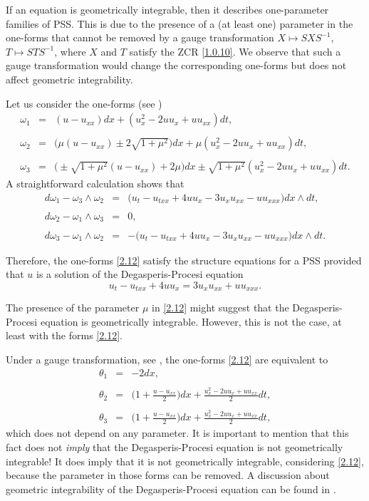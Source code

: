 \documentclass{cimart}
\newcommand{\ba}{\begin{array}}
\newcommand{\bb}{\begin{equation}}
\newcommand{\ea}{\end{array}}
\newcommand{\ee}{\end{equation}}
\begin{document}
\begin{remark}
 If an equation is geometrically integrable, then it describes one-parameter families of PSS. This is due to the presence of a (at least one) parameter in the one-forms that cannot be removed by a gauge transformation $X\mapsto SXS^{-1}$, $ T\mapsto STS^{-1}$, where $X$ and $T$ satisfy the ZCR \eqref{1.0.10}. We observe that such a gauge transformation would change the corresponding one-forms but does not affect geometric integrability.

Let us consider the one-forms (see \cite[Example 2.8]{tarcisio})
\bb\label{2.12}
\ba{lcl}
\omega_1&=&(u-u_{xx})dx+(u_x^2-2uu_x+uu_{xx})dt,\\
\\
\omega_2&=&\Big(\mu(u-u_{xx})\pm 2\sqrt{1+\mu^2}\Big)dx+\mu(u_x^2-2uu_x+uu_{xx})dt,\\
\\
\omega_3&=&\Big(\pm\sqrt{1+\mu^2}(u-u_{xx})+2\mu\Big)dx\pm\sqrt{1+\mu^2}(u_x^2-2uu_x+uu_{xx})dt.
\ea
\ee
A straightforward calculation shows that
$$
\ba{lcl}
d\omega_1-\omega_3\wedge\omega_2&=&{\Big(u_t-u_{txx}+4uu_x-3u_xu_{xx}-uu_{xxx}\Big)dx\wedge dt,}\\
\\
d\omega_2-\omega_1\wedge\omega_3&=&0,\\
\\
d\omega_3-\omega_1\wedge\omega_2&=&{-\Big(u_t-u_{txx}+4uu_x-3u_xu_{xx}-uu_{xxx}\Big)dx\wedge dt}.
\ea
$$

Therefore, the one-forms \eqref{2.12} satisfy the structure equations for a PSS provided that $u$ is a solution of the Degasperis-Procesi equation
$$
u_t-u_{txx}+4uu_x=3u_xu_{xx}+uu_{xxx}.
$$

The presence of the parameter $\mu$ in \eqref{2.12} might suggest that the Degasperis-Procesi equation is geometrically integrable. However, this is not the case, at least with the forms \eqref{2.12}.

Under a gauge transformation, see \cite[Section 8]{freire-dp}, the one-forms \eqref{2.12} are equivalent to
$$
\ba{lcl}
    \theta_1&=&-2dx,\\
    \\
    \theta_2&=&{\Big(1+\frac{u-u_{xx}}{2}\Big)dx+\frac{u_x^2-2uu_x+uu_{xx}}{2}dt},\\
    \\
    \theta_3&=&{\Big(1+\frac{u-u_{xx}}{2}\Big)dx+\frac{u_x^2-2uu_x+uu_{xx}}{2}dt,}
    \ea
$$
which does not depend on any parameter. It is important to mention that this fact does not {\it imply} that the Degasperis-Procesi equation is not geometrically integrable! It does imply that it is not geometrically integrable, considering \eqref{2.12}, because the parameter in those forms can be removed. A discussion about geometric integrability of the Degasperis-Procesi equation can be found in \cite[Discussion]{freire-dp}.
\end{remark}
\end{document}
